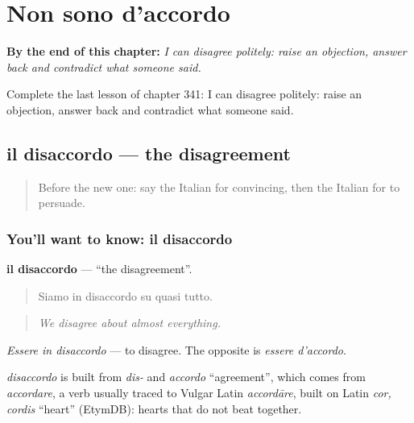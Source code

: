 
\chapter{Non sono d'accordo}
\label{ch:it-non-sono-d-accordo}

\begin{chapteropening}
\textbf{By the end of this chapter:} \emph{I can disagree politely: raise an objection, answer back and contradict what someone said.}

Complete the last lesson of chapter 341: I can disagree politely: raise an objection, answer back and contradict what someone said.
\end{chapteropening}

\section[il disaccordo]{il disaccordo — the disagreement}

\label{lesson:IT-C341-disaccordo}



\begin{quote}
Before the new one: say the Italian for convincing, then the Italian for to persuade.
\end{quote}

\subsection*{You'll want to know: il disaccordo}
\textbf{il disaccordo} — \textquotedblleft{}the disagreement\textquotedblright{}.

\begin{quote}
Siamo in disaccordo su quasi tutto.
\end{quote}

\begin{quote}
\emph{We disagree about almost everything.}
\end{quote}

\emph{Essere in disaccordo} — to disagree. The opposite is \emph{essere d'accordo}.

\begin{cousinweb}
\emph{disaccordo} is built from \emph{dis-} and \emph{accordo} \textquotedblleft{}agreement\textquotedblright{}, which comes from \emph{accordare}, a verb usually traced to Vulgar Latin \emph{accordāre}, built on Latin \emph{cor, cordis} \textquotedblleft{}heart\textquotedblright{} (EtymDB): hearts that do not beat together.
\end{cousinweb}

